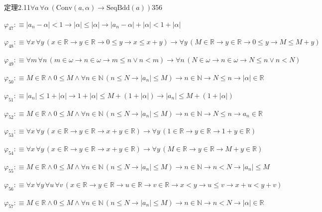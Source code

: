 \begin{fullproof}{定理2.11}{$\forall a\,\forall \alpha\,(\mathrm{Conv}(a,\alpha) \to \mathrm{SeqBdd}(a))$}{356}
\begin{abbrevlist}
\item $\varphi_{47} :\equiv \lvert a_{n} - \alpha \rvert < 1 \to \lvert \alpha \rvert \leq \lvert \alpha \rvert \to \lvert a_{n} - \alpha \rvert + \lvert \alpha \rvert < 1 + \lvert \alpha \rvert$
\item $\varphi_{48} :\equiv \forall x\,\forall y\,(x \in \mathbb{R} \to y \in \mathbb{R} \to 0 \leq y \to x \leq x + y) \to \forall y\,(M \in \mathbb{R} \to y \in \mathbb{R} \to 0 \leq y \to M \leq M + y)$
\item $\varphi_{49} :\equiv \forall m\,\forall n\,(m \in \omega \to n \in \omega \to m \leq n \lor n < m) \to \forall n\,(N \in \omega \to n \in \omega \to N \leq n \lor n < N)$
\item $\varphi_{50} :\equiv M \in \mathbb{R} \land 0 \leq M \land \forall n \in \mathbb{N}\,(n \leq N \to \lvert a_{n} \rvert \leq M) \to n \in \mathbb{N} \to N \leq n \to \lvert \alpha \rvert \in \mathbb{R}$
\item $\varphi_{51} :\equiv \lvert a_{n} \rvert \leq 1 + \lvert \alpha \rvert \to 1 + \lvert \alpha \rvert \leq M + (1 + \lvert \alpha \rvert) \to \lvert a_{n} \rvert \leq M + (1 + \lvert \alpha \rvert)$
\item $\varphi_{52} :\equiv M \in \mathbb{R} \land 0 \leq M \land \forall n \in \mathbb{N}\,(n \leq N \to \lvert a_{n} \rvert \leq M) \to n \in \mathbb{N} \to N \leq n \to a_{n} \in \mathbb{R}$
\item $\varphi_{53} :\equiv \forall x\,\forall y\,(x \in \mathbb{R} \to y \in \mathbb{R} \to x + y \in \mathbb{R}) \to \forall y\,(1 \in \mathbb{R} \to y \in \mathbb{R} \to 1 + y \in \mathbb{R})$
\item $\varphi_{54} :\equiv \forall x\,\forall y\,(x \in \mathbb{R} \to y \in \mathbb{R} \to x + y \in \mathbb{R}) \to \forall y\,(M \in \mathbb{R} \to y \in \mathbb{R} \to M + y \in \mathbb{R})$
\item $\varphi_{55} :\equiv M \in \mathbb{R} \land 0 \leq M \land \forall n \in \mathbb{N}\,(n \leq N \to \lvert a_{n} \rvert \leq M) \to n \in \mathbb{N} \to n < N \to \lvert a_{n} \rvert \leq M$
\item $\varphi_{56} :\equiv \forall x\,\forall y\,\forall u\,\forall v\,(x \in \mathbb{R} \to y \in \mathbb{R} \to u \in \mathbb{R} \to v \in \mathbb{R} \to x < y \to u \leq v \to x + u < y + v)$
\item $\varphi_{57} :\equiv M \in \mathbb{R} \land 0 \leq M \land \forall n \in \mathbb{N}\,(n \leq N \to \lvert a_{n} \rvert \leq M) \to n \in \mathbb{N} \to n < N \to \lvert \alpha \rvert \in \mathbb{R}$

\end{abbrevlist}
\end{fullproof}
